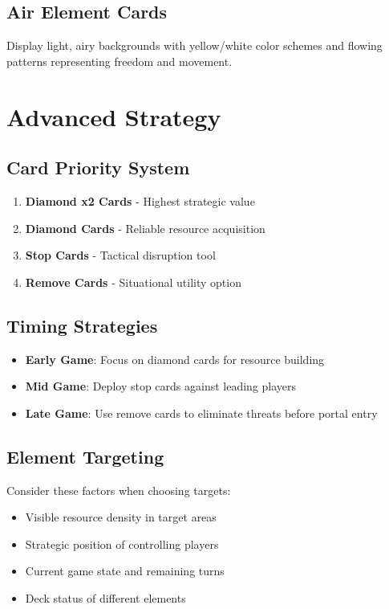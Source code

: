 \documentclass[12pt,a4paper]{article}
\begin{document}
\subsection{\textcolor{airyellow}{Air Element Cards}}
Display light, airy backgrounds with yellow/white color schemes and flowing patterns representing freedom and movement.

\section{Advanced Strategy}

\subsection{Card Priority System}
\begin{enumerate}
    \item \textbf{Diamond x2 Cards} - Highest strategic value
    \item \textbf{Diamond Cards} - Reliable resource acquisition  
    \item \textbf{Stop Cards} - Tactical disruption tool
    \item \textbf{Remove Cards} - Situational utility option
\end{enumerate}

\subsection{Timing Strategies}
\begin{itemize}
    \item \textbf{Early Game}: Focus on diamond cards for resource building
    \item \textbf{Mid Game}: Deploy stop cards against leading players
    \item \textbf{Late Game}: Use remove cards to eliminate threats before portal entry
\end{itemize}

\subsection{Element Targeting}
Consider these factors when choosing targets:
\begin{itemize}
    \item Visible resource density in target areas
    \item Strategic position of controlling players
    \item Current game state and remaining turns
    \item Deck status of different elements
\end{itemize}
\end{document}
